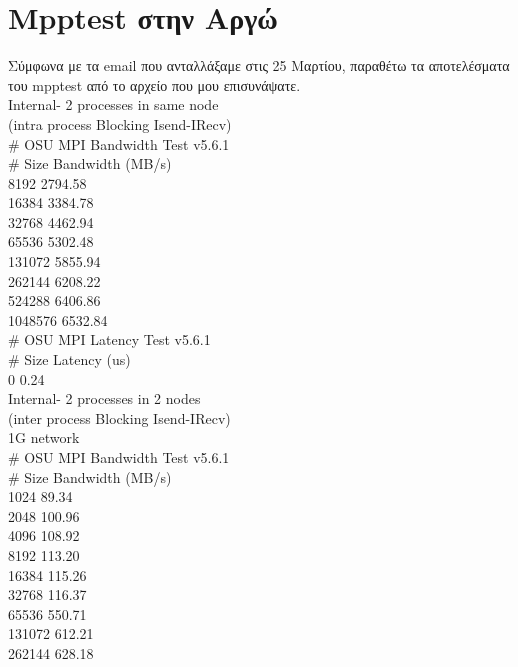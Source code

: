 \section{Mpptest στην Αργώ}

Σύμφωνα με τα email που ανταλλάξαμε στις 25 Μαρτίου, παραθέτω τα αποτελέσματα του mpptest από το αρχείο που μου επισυνάψατε. \\
\newline
Internal- 2 processes in same node \\
(intra process Blocking Isend-IRecv) \\
\# OSU MPI Bandwidth Test v5.6.1 \\
\# Size      Bandwidth (MB/s) \\
8192                 2794.58 \\
16384                3384.78 \\
32768                4462.94 \\
65536                5302.48 \\
131072               5855.94 \\
262144               6208.22 \\
524288               6406.86 \\
1048576              6532.84 \\
\# OSU MPI Latency Test v5.6.1 \\
\# Size          Latency (us) \\
0                       0.24 \\
\newline
Internal- 2 processes in 2 nodes \\
(inter process Blocking Isend-IRecv) \\
1G network \\
\# OSU MPI Bandwidth Test v5.6.1 \\
\# Size      Bandwidth (MB/s) \\
1024                   89.34 \\
2048                  100.96 \\
4096                  108.92 \\
8192                  113.20 \\
16384                 115.26 \\
32768                 116.37 \\
65536                 550.71 \\
131072                612.21 \\
262144                628.18 \\

